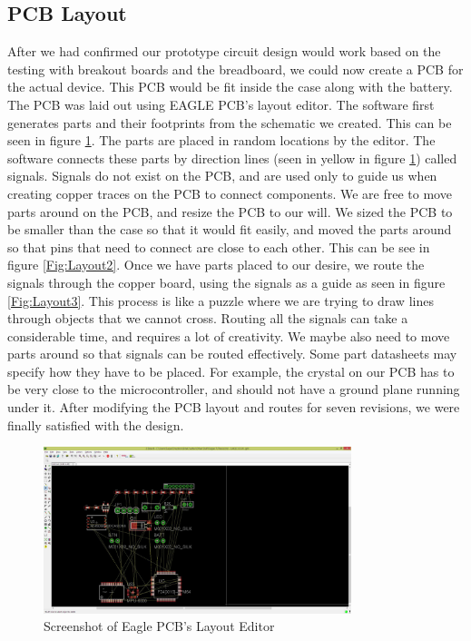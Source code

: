\subsection{PCB Layout}
After we had confirmed our prototype circuit design would work based on the testing with breakout boards and the breadboard,
we could now create a PCB for the actual device.
This PCB would be fit inside the case along with the battery.
The PCB was laid out using EAGLE PCB's layout editor.
The software first generates parts and their footprints from the schematic we created.
This can be seen in figure \ref{Fig:Layout1}.
The parts are placed in random locations by the editor.
The software connects these parts by direction lines (seen in yellow in figure \ref{Fig:Layout1}) called signals.
Signals do not exist on the PCB,
and are used only to guide us when creating copper traces on the PCB to connect components.
We are free to move parts around on the PCB, and resize the PCB to our will.
We sized the PCB to be smaller than the case so that it would fit easily, and moved the parts around so that pins that need to connect are close to each other.
This can be see in figure \ref{Fig:Layout2}.
Once we have parts placed to our desire,
we route the signals through the copper board,
using the signals as a guide as seen in figure \ref{Fig:Layout3}.
This process is like a puzzle where we are trying to draw lines through objects that we cannot cross.
Routing all the signals can take a considerable time,
and requires a lot of creativity.
We maybe also need to move parts around so that signals can be routed effectively.
Some part datasheets may specify how they have to be placed.
For example,
the crystal on our PCB has to be very close to the microcontroller,
and should not have a ground plane running under it.
After modifying the PCB layout and routes for seven revisions,
we were finally satisfied with the design.
\begin{figure}
\begin{center}
\includegraphics[width=0.8\textwidth]{images/Layout1.jpg}
\caption{Screenshot of Eagle PCB's Layout Editor}
\label{Fig:Layout1}
\end{center}
\end{figure}
